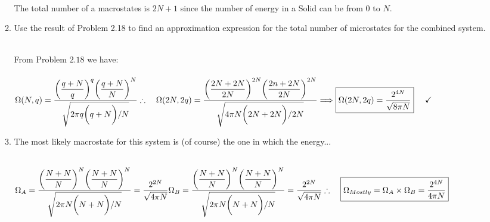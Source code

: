 \documentclass[fleqn]{article}
\begin{document}
\begin{enumerate}
\begin{enumerate}
        \textcolor{hwColor}{
          \\
          The total number of a macrostates is $2N+1$ since the number of energy in a Solid can be from $0$ to $N$.
          \\ 
        }

      \item Use the result of Problem 2.18 to find an approximation expression for the total number of microstates for 
      the combined system.

        \textcolor{hwColor}{
          \\
          From Problem $2.18$ we have:
          \\
          \\
          $
            \Omega(N,q)=\dfrac{
              \bigg( \dfrac{q+N}{q} \bigg)^q \bigg( \dfrac{q+N}{N} \bigg)^N
            }{
              \sqrt{2 \pi q \bigg( q+N\bigg)/N}
            }
            \\
            \\
            \\
            \therefore ~~~  \Omega(2N,2q)=\dfrac{
              \bigg( \dfrac{2N+2N}{2N} \bigg)^{2N} \bigg( \dfrac{2n+2N}{2N} \bigg)^{2N}
            }{
              \sqrt{4 \pi N \bigg( 2N+2N\bigg)/2N}
            }
            \Longrightarrow \boxed{
              \Omega(2N,2q)=\dfrac{2^{4N}}{\sqrt{8 \pi N}}
            } ~~~~ \checkmark
            \\
          $
        }

      \item The most likely macrostate for this system is (of course) the one in which the energy...

        \textcolor{hwColor}{
          \\
          $
            \Omega_A=\dfrac{
              \bigg( \dfrac{N+N}{N} \bigg)^{N} \bigg( \dfrac{N+N}{N} \bigg)^{N}
            }{
              \sqrt{2 \pi N \bigg( N+N\bigg)/N}
            }=\dfrac{2^{2N}}{\sqrt{4 \pi N}}
            \\
            \\
            \\
            \\
            \Omega_B=\dfrac{
              \bigg( \dfrac{N+N}{N} \bigg)^{N} \bigg( \dfrac{N+N}{N} \bigg)^{N}
            }{
              \sqrt{2 \pi N \bigg( N+N\bigg)/N}
            }=\dfrac{2^{2N}}{\sqrt{4 \pi N}}
            \\
            \\
            \\
            \therefore ~~~ \boxed{
              \Omega_{Mostly}=\Omega_A \times \Omega_B=\dfrac{2^{4N}}{4 \pi N}
            }
            \\
          $
        }


\end{enumerate}
\end{enumerate}
\end{document}
